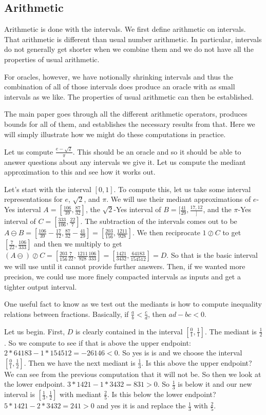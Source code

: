 \documentclass[12pt]{article}
\theoremstyle{remark}
\begin{document}
\subsection{Arithmetic}

Arithmetic is done with the intervals. We first define arithmetic on intervals. That arithmetic is different than usual number arithmetic. In particular, intervals do not generally get shorter when we combine them and we do not have all the properties of usual arithmetic. 

For oracles, however, we have notionally shrinking intervals and thus the combination of all of those intervals does produce an oracle with as small intervals as we like. The properties of usual arithmetic can then be established.  

The main paper goes through all the different arithmetic operators, produces bounds for all of them, and establishes the necessary results from that. Here we will simply illustrate how we might do these computations in practice. 

Let us compute $\frac{e-\sqrt{2}}{\pi}$. This should be an oracle and so it should be able to answer questions about any intervals we give it. Let us compute the mediant approximation to this and see how it works out.  

Let's start with the interval $[0,1]$. To compute this, let us take some interval representations for $e$, $\sqrt{2}$, and $\pi$. We will use their mediant approximations of $e$-Yes interval $A  = [\frac{106}{39}, \frac{87}{32}]$, the $\sqrt{2}$-Yes interval of $B = [\frac{41}{29}, \frac{17, 12}]$, and the $\pi$-Yes interval of $C= [\frac{333}{106}, \frac{22}{7}]$. The subtraction of the intervals comes out to be $A\ominus B = [\frac{106}{39} - \frac{17}{12}, \frac{87}{32} - \frac{41}{29}] = [\frac{203}{156}, \frac{1211}{928}]$.  We then reciprocate $1\oslash C$ to get $[\frac{7}{22}, \frac{106}{333}]$ and then we multiply to get $(A\ominus)\oslash C = [\frac{203}{156} \frac{7}{22}, \frac{1211}{928}\frac{106}{333}] = [\frac{1421}{3432}, \frac{64183}{154512}] = D$. So that is the basic interval we will use until it cannot provide further answers. Then, if we wanted more precision, we could use more finely compacted intervals as inputs and get a tighter output interval. 

One useful fact to know as we test out the mediants is how to compute inequality relations between fractions. Basically, if $\frac{a}{b} < \frac{c}{d}$, then $ad - bc < 0$. 

Let us begin. First, $D$ is clearly contained in the interval $[\frac{0}{1},\frac{1}{1}]$. The mediant is $\frac{1}{2}$. So we compute to see if that is above the upper endpoint:  $2*64183 - 1*154512 = -26146 < 0$. So yes is is and we choose the interval $[\frac{0}{1}, \frac{1}{2}]$. Then we have the next mediant is $\frac{1}{3}$. Is this above the upper endpoint? We can see from the previous computation that it will not be. So then we look at the lower endpoint. $3*1421 - 1*3432 = 831>0$. So $\frac{1}{3}$ is below it and our new interval is $[\frac{1}{3}, \frac{1}{2}]$ with mediant $\frac{2}{5}$. Is this below the lower endpoint? $5*1421 - 2*3432 = 241 > 0$ and yes it is and replace the $\frac{1}{3}$ with $\frac{2}{5}$.
\end{document}
